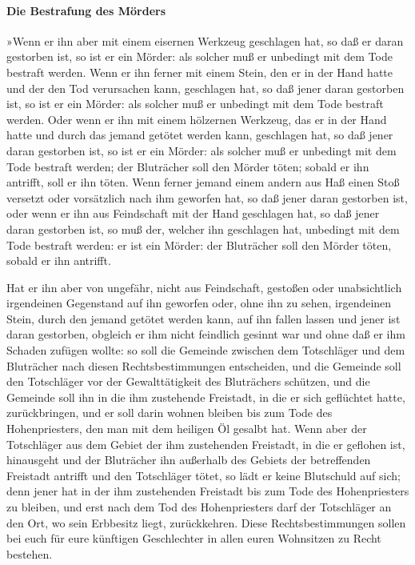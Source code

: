 \hypertarget{die-bestrafung-des-muxf6rders}{%
\paragraph{Die Bestrafung des
Mörders}\label{die-bestrafung-des-muxf6rders}}

»Wenn er ihn aber mit einem eisernen Werkzeug geschlagen
hat, so daß er daran gestorben ist, so ist er ein Mörder: als solcher
muß er unbedingt mit dem Tode bestraft werden. Wenn er
ihn ferner mit einem Stein, den er in der Hand hatte und der den Tod
verursachen kann, geschlagen hat, so daß jener daran gestorben ist, so
ist er ein Mörder: als solcher muß er unbedingt mit dem Tode bestraft
werden. Oder wenn er ihn mit einem hölzernen Werkzeug,
das er in der Hand hatte und durch das jemand getötet werden kann,
geschlagen hat, so daß jener daran gestorben ist, so ist er ein Mörder:
als solcher muß er unbedingt mit dem Tode bestraft werden;
der Bluträcher soll den Mörder töten; sobald er ihn
antrifft, soll er ihn töten. Wenn ferner jemand einem
andern aus Haß einen Stoß versetzt oder vorsätzlich nach ihm geworfen
hat, so daß jener daran gestorben ist, oder wenn er ihn
aus Feindschaft mit der Hand geschlagen hat, so daß jener daran
gestorben ist, so muß der, welcher ihn geschlagen hat, unbedingt mit dem
Tode bestraft werden: er ist ein Mörder: der Bluträcher soll den Mörder
töten, sobald er ihn antrifft.

Hat er ihn aber von ungefähr, nicht aus Feindschaft,
gestoßen oder unabsichtlich irgendeinen Gegenstand auf ihn geworfen
oder, ohne ihn zu sehen, irgendeinen Stein, durch den
jemand getötet werden kann, auf ihn fallen lassen und jener ist daran
gestorben, obgleich er ihm nicht feindlich gesinnt war und ohne daß er
ihm Schaden zufügen wollte: so soll die Gemeinde zwischen
dem Totschläger und dem Bluträcher nach diesen Rechtsbestimmungen
entscheiden, und die Gemeinde soll den Totschläger vor
der Gewalttätigkeit des Bluträchers schützen, und die Gemeinde soll ihn
in die ihm zustehende Freistadt, in die er sich geflüchtet hatte,
zurückbringen, und er soll darin wohnen bleiben bis zum Tode des
Hohenpriesters, den man mit dem heiligen Öl gesalbt hat.
Wenn aber der Totschläger aus dem Gebiet der ihm
zustehenden Freistadt, in die er geflohen ist, hinausgeht
und der Bluträcher ihn außerhalb des Gebiets der
betreffenden Freistadt antrifft und den Totschläger tötet, so lädt er
keine Blutschuld auf sich; denn jener hat in der ihm
zustehenden Freistadt bis zum Tode des Hohenpriesters zu bleiben, und
erst nach dem Tod des Hohenpriesters darf der Totschläger an den Ort, wo
sein Erbbesitz liegt, zurückkehren. Diese
Rechtsbestimmungen sollen bei euch für eure künftigen Geschlechter in
allen euren Wohnsitzen zu Recht bestehen.

